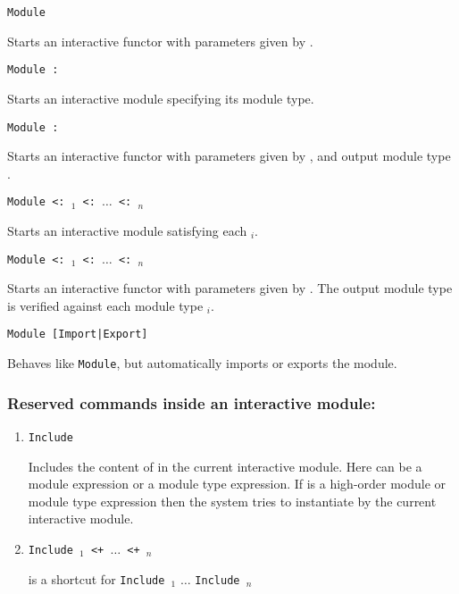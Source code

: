 \begin{Variants}

\item{\tt Module {\ident} {\modbindings}}

  Starts an interactive functor with parameters given by {\modbindings}.

\item{\tt Module {\ident} \verb.:. {\modtype}}

  Starts an interactive module specifying its module type.

\item{\tt Module {\ident} {\modbindings} \verb.:. {\modtype}}

  Starts an interactive functor with parameters given by
  {\modbindings}, and output module type {\modtype}.

\item{\tt Module {\ident} \verb.<:. {\modtype$_1$} \verb.<:. $\ldots$ \verb.<:.{ \modtype$_n$}}

  Starts an interactive module satisfying each {\modtype$_i$}.

\item{\tt Module {\ident} {\modbindings} \verb.<:. {\modtype$_1$} \verb.<:. $\ldots$ \verb.<:. {\modtype$_n$}}

  Starts an interactive functor with parameters given by
  {\modbindings}. The output module type is verified against each
  module type {\modtype$_i$}.

\item\texttt{Module [Import|Export]}

  Behaves like \texttt{Module}, but automatically imports or exports
  the module.

\end{Variants}
\subsubsection{Reserved commands inside an interactive module:
}
\begin{enumerate}
\item {\tt Include {\module}}

  Includes the content of {\module} in the current interactive
 module. Here {\module} can be a module expression or a module type
 expression. If {\module} is a high-order module or module type
 expression then the system tries to instantiate {\module}
 by the current interactive module.

\item {\tt Include {\module$_1$} \verb.<+. $\ldots$ \verb.<+. {\module$_n$}}

is a shortcut for {\tt Include {\module$_1$}}  $\ldots$ {\tt Include {\module$_n$}}
\end{enumerate}
